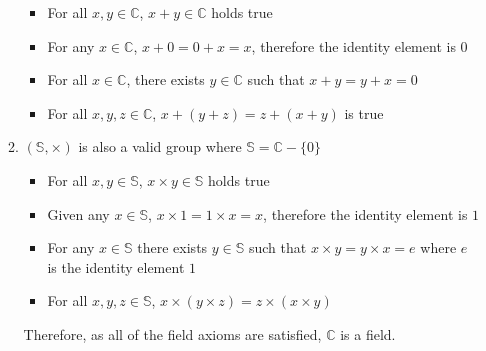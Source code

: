\documentclass[11pt]{article}
\newcommand{\C}{{\mathbb{C}}}
\begin{document}
\begin{enumerate}[{\bf S1.}]
\begin{enumerate}
\begin{itemize}
                \item For all $x, y\in\C$, $x + y\in\C$ holds true
                \item For any $x\in\C$, $x + 0 = 0 + x = x$, therefore the identity element is $0$
                \item For all $x\in\C$, there exists $y\in\C$ such that $x + y = y + x = 0$
                \item For all $x, y, z\in\C$, $x + (y + z) = z + (x + y)$ is true

            \end{itemize}

            \item $(\mathbb{S}, \times)$ is also a valid group where $\mathbb{S} = \C - \{0\}$
            
            \begin{itemize}
                
                \item For all $x, y\in\mathbb{S}$, $x\times y\in\mathbb{S}$ holds true
                \item Given any $x\in\mathbb{S}$, $x\times 1 = 1 \times x = x$, therefore the identity element is $1$
                \item For any $x\in\mathbb{S}$ there exists $y\in\mathbb{S}$ such that $x\times y = y\times x = e$ where $e$ is the 
                      identity element $1$
                \item For all $x, y, z\in\mathbb{S}$, $x\times(y\times z) = z\times (x\times y)$

            \end{itemize}

            Therefore, as all of the field axioms are satisfied, $\C$ is a field. 

        \end{enumerate}

    \end{enumerate}
\end{document}
